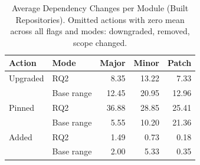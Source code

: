 \begin{table}[htbp]
\centering
\caption{Average Dependency Changes per Module (Built Repositories). Omitted actions with zero mean across all flags and modes: downgraded, removed, scope changed.}
\label{tab:combined_action_averages}
\begin{tabular}{llrrr}
\toprule
\textbf{Action} & \textbf{Mode} & \textbf{Major} & \textbf{Minor} & \textbf{Patch} \\
\midrule
Upgraded & RQ2 & 8.35 & 13.22 & 7.33 \\
 & Base range & 12.45 & 20.95 & 12.96 \\
\midrule
Pinned & RQ2 & 36.88 & 28.85 & 25.41 \\
 & Base range & 5.55 & 10.20 & 21.36 \\
\midrule
Added & RQ2 & 1.49 & 0.73 & 0.18 \\
 & Base range & 2.00 & 5.33 & 0.35 \\
\bottomrule
\end{tabular}
\end{table}
